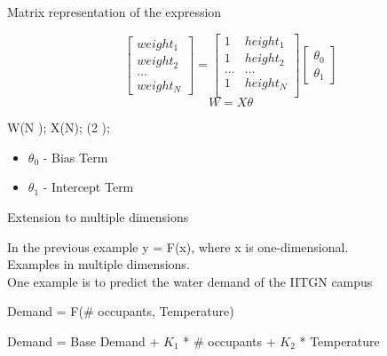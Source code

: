 \documentclass{beamer}
\begin{document}
\begin{frame}{Matrix representation of the expression}



\[\begin{bmatrix}
    weight_{1}   \\
    weight_{2}   \\
    \dots \\
    weight_{N}
\end{bmatrix}
= \begin{bmatrix}
    1& height_{1}   \\
    1& height_{2}   \\
    \dots & \dots  \\
    1& height_{N}   \\
\end{bmatrix}
\begin{bmatrix}
    \theta_{0} \\
    \theta_{1}
\end{bmatrix}\]
\[W=X\theta \]


W(N ); X(N); \theta(2 );


\begin{itemize}
    \item<+-> $\theta_{0}$ - Bias Term
    \item<+-> $\theta_{1}$ - Intercept Term
\end{itemize}
\end{frame}



\begin{frame}{Extension to multiple dimensions}

In the previous example y = F(x), where x is one-dimensional.\\
Examples in multiple dimensions.\\
One example is to predict the water demand of the IITGN campus

\small{
\begin{center}
    \begin{tcolorbox}
        Demand = F(\# occupants, Temperature)
    \end{tcolorbox}
\end{center}

\begin{center}
    \begin{tcolorbox}
        Demand = Base Demand + $K_{1}$ * \# occupants + $K_{2}$ * Temperature
    \end{tcolorbox}
\end{center}
}

\end{frame}
\end{document}
